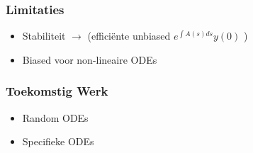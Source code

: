 \documentclass[18pt,aspectratio=149]{beamer}
\begin{document}
\begin{frame}
    \frametitle{Limitaties}
    \begin{itemize}
        \item Stabiliteit $\rightarrow$ \cite{kettunen_unbiased_2021}
              (efficiënte unbiased $e^{\int A(s) ds } y(0)$ )
        \item Biased voor non-lineaire ODEs
    \end{itemize}
\end{frame}

\begin{frame}
    \frametitle{Toekomstig Werk}
    \begin{itemize}
        \item Random ODEs
        \item Specifieke ODEs
    \end{itemize}
\end{frame}

\end{document}
